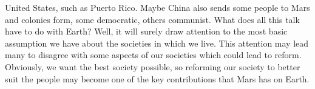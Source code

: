 \documentclass[main.tex]{subfiles}
\begin{document}
United States, such as Puerto Rico. Maybe China also sends some people to Mars and colonies form, some democratic, others communist. What does all this talk have to do with Earth? Well, it will surely draw attention to the most basic assumption we have about the societies in which we live. This attention may lead many to disagree with some aspects of our societies which could lead to reform. Obviously, we want the best society possible, so reforming our society to better suit the people may become one of the key contributions that Mars has on Earth.
\end{document}
